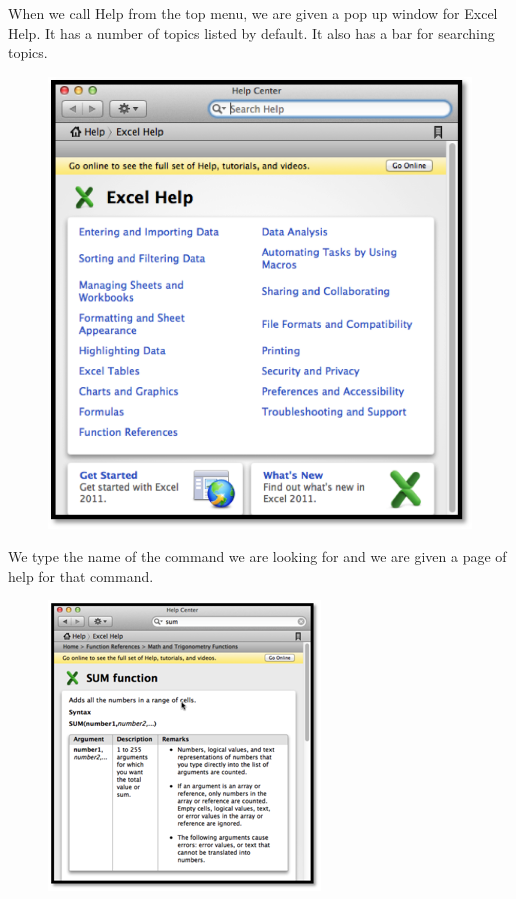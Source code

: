 \documentclass[10pt,]{book}
\theoremstyle{plain}
\theoremstyle{definition}
\theoremstyle{definition}
\begin{document}
When we call Help from the top menu, we are given a pop up window for Excel Help.  It has a number of topics listed by default.  It also has a bar for searching topics.%
\leavevmode%
\begin{figure}
\centering
\includegraphics[width=0.8\linewidth]{images/sec1-3-16.png}
\end{figure}
\par
We type the name of the command we are looking for and we are given a page of help for that command.%
\leavevmode%
\begin{figure}
\centering
\includegraphics[width=0.8\linewidth]{images/sec1-3-17.png}
\end{figure}
\par
\end{document}
